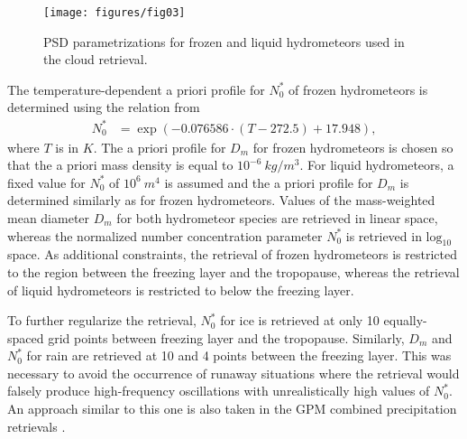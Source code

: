 \documentclass[journal abbreviation, manuscript]{copernicus}
\begin{document}
\begin{figure}
\centering
\texttt{[image: figures/fig03]}
\caption{PSD parametrizations for frozen and liquid hydrometeors
 used in the cloud retrieval.}
\label{fig:psds_retrieval}
\end{figure}

The temperature-dependent a priori profile for $N_0^*$ of frozen
hydrometeors is determined using the relation from \cite{delanoe14}
%
\begin{align}
N_0^* &= \exp \left ( -0.076586 \cdot (T - 272.5) + 17.948 \right ),
\end{align}
%
where $T$ is in $\unit{K}$. The a priori profile for $D_m$ for frozen
hydrometeors is chosen so that the a priori mass density is equal to
$10^{-6}\ \unit{kg/m^3}$. For liquid hydrometeors, a fixed value for $N_0^*$ of
$10^6\ \unit{m^4}$ is assumed and the a priori profile for $D_m$ is determined
similarly as for frozen hydrometeors. Values of the mass-weighted mean diameter
$D_m$ for both hydrometeor species are retrieved in linear space, whereas the
normalized number concentration parameter $N_0^*$ is retrieved in
$\text{log}_{10}$ space. As additional constraints, the retrieval of frozen
hydrometeors is restricted to the region between the freezing layer and the
tropopause, whereas the retrieval of liquid hydrometeors is restricted to below
the freezing layer.

To further regularize the retrieval, $N_0^*$ for ice is retrieved at only
10 equally-spaced grid points between freezing layer and the tropopause.
Similarly, $D_m$  and $N_0^*$ for rain are retrieved at 10 and 4 points
between the freezing layer. This was necessary to avoid the occurrence
of runaway situations where the retrieval would falsely produce high-frequency
oscillations with unrealistically high values of $N_0^*$. An approach similar
to this one is also taken in the GPM combined precipitation retrievals
\citep{grecu16}.
\end{document}
